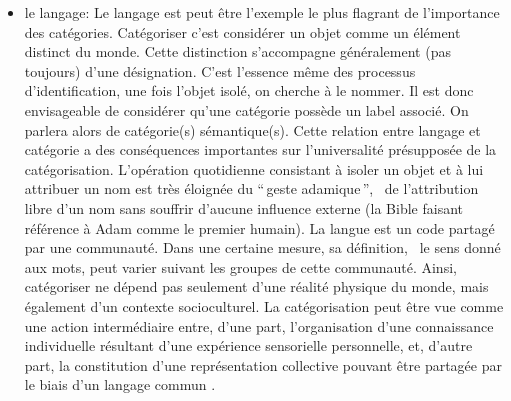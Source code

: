 \begin{itemize}

\item le langage:  Le langage est peut être l'exemple le plus flagrant de l'importance des catégories. Catégoriser c'est considérer un objet comme un élément distinct du monde. Cette distinction s'accompagne généralement (pas toujours) d'une désignation. C'est l'essence même des processus d'identification, une fois l'objet isolé, on cherche à le nommer. Il est donc envisageable de considérer qu'une catégorie possède un label associé. On parlera alors de catégorie(s) sémantique(s). Cette relation entre langage et catégorie a des conséquences importantes sur l'universalité présupposée de la catégorisation. L'opération quotidienne consistant à isoler un objet et à lui attribuer un nom est très éloignée du ``\,geste adamique\,'', \ie~de l'attribution libre d'un nom sans souffrir d'aucune influence externe (la Bible faisant référence à Adam comme le premier humain). La langue est un code partagé par une communauté. Dans une certaine mesure, sa définition, \ie~le sens donné aux mots, peut varier suivant les groupes de cette communauté. Ainsi, catégoriser ne dépend pas seulement d'une réalité physique du monde, mais également d'un contexte socioculturel. La catégorisation peut être vue comme une action intermédiaire entre, d'une part, l'organisation d'une connaissance individuelle résultant d'une expérience sensorielle personnelle, et, d'autre part, la constitution d'une représentation collective pouvant être partagée par le biais d'un langage commun \citep{dubois2006cognitive}. 

\end{itemize}
